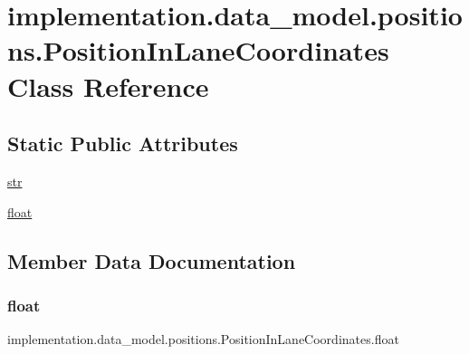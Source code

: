 \hypertarget{classimplementation_1_1data__model_1_1positions_1_1_position_in_lane_coordinates}{}\section{implementation.\+data\+\_\+model.\+positions.\+Position\+In\+Lane\+Coordinates Class Reference}
\label{classimplementation_1_1data__model_1_1positions_1_1_position_in_lane_coordinates}
\subsection*{Static Public Attributes}
\begin{DoxyCompactItemize}
\item 
\hyperlink{classimplementation_1_1data__model_1_1positions_1_1_position_in_lane_coordinates_a0bc4ca4d3bd147f689e5690460da24ec}{str}
\item 
\hyperlink{classimplementation_1_1data__model_1_1positions_1_1_position_in_lane_coordinates_a3174976559286cff0d7ad21c3bccc495}{float}
\end{DoxyCompactItemize}


\subsection{Member Data Documentation}
\mbox{\label{classimplementation_1_1data__model_1_1positions_1_1_position_in_lane_coordinates_a3174976559286cff0d7ad21c3bccc495}} 
\subsubsection{\texorpdfstring{float}{float}}
{\footnotesize\ttfamily implementation.\+data\+\_\+model.\+positions.\+Position\+In\+Lane\+Coordinates.\+float\hspace{0.3cm}{\ttfamily [static]}}

